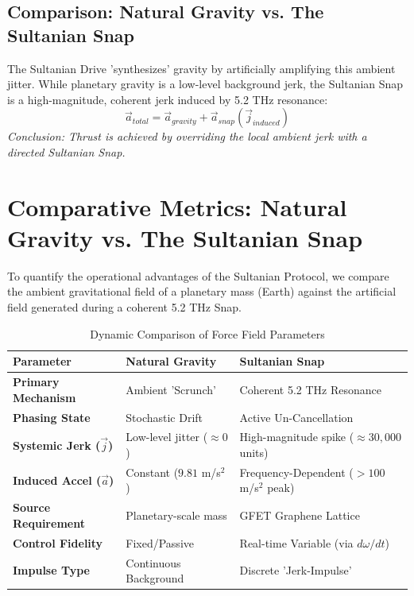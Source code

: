 \documentclass[11pt]{article}
\begin{document}
\subsection{Comparison: Natural Gravity vs. The Sultanian Snap}
The Sultanian Drive 'synthesizes' gravity by artificially amplifying this ambient jitter. While planetary gravity is a low-level background jerk, the Sultanian Snap is a high-magnitude, coherent jerk induced by 5.2 THz resonance:
\begin{equation}
    \vec{a}_{total} = \vec{a}_{gravity} + \vec{a}_{snap}(\vec{j}_{induced})
\end{equation}
\textit{Conclusion: Thrust is achieved by overriding the local ambient jerk with a directed Sultanian Snap.}

\section{Comparative Metrics: Natural Gravity vs. The Sultanian Snap}

To quantify the operational advantages of the Sultanian Protocol, we compare the ambient gravitational field of a planetary mass (Earth) against the artificial field generated during a coherent 5.2 THz Snap.

\begin{table}[h!]
\centering
\caption{Dynamic Comparison of Force Field Parameters}
\label{tab:comparison}
\begin{tabular}{@{}lll@{}}
\toprule
\textbf{Parameter} & \textbf{Natural Gravity} & \textbf{Sultanian Snap} \\ \midrule
\textbf{Primary Mechanism} & Ambient 'Scrunch' & Coherent 5.2 THz Resonance \\
\textbf{Phasing State} & Stochastic Drift & Active Un-Cancellation \\
\textbf{Systemic Jerk ($\vec{j}$)} & Low-level jitter ($\approx 0$) & High-magnitude spike ($\approx 30,000$ units) \\
\textbf{Induced Accel ($\vec{a}$)} & Constant ($9.81$ m/s$^2$) & Frequency-Dependent ($>100$ m/s$^2$ peak) \\
\textbf{Source Requirement} & Planetary-scale mass & GFET Graphene Lattice \\
\textbf{Control Fidelity} & Fixed/Passive & Real-time Variable (via $d\omega/dt$) \\
\textbf{Impulse Type} & Continuous Background & Discrete 'Jerk-Impulse' \\ \bottomrule
\end{tabular}
\end{table}
\end{document}
